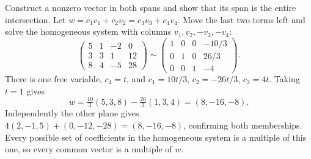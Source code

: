 \goal Construct a nonzero vector in both spans and show that its span is the entire intersection.
Let $w=c_1v_1+c_2v_2=c_3v_3+c_4v_4$. Move the last two terms left and
solve the homogeneous system with columns $v_1,v_2,-v_3,-v_4$:
\[
 \begin{pmatrix}5&1&-2&0\\3&3&1&12\\8&4&-5&28\end{pmatrix}
 \sim
 \begin{pmatrix}1&0&0&-10/3\\0&1&0&26/3\\0&0&1&-4\end{pmatrix}.
\]
There is one free variable, $c_4=t$, and
$c_1=10t/3$, $c_2=-26t/3$, $c_3=4t$. Taking $t=1$ gives
\[
 w=\tfrac{10}3(5,3,8)-\tfrac{26}3(1,3,4)=(8,-16,-8).
\]
Independently the other plane gives
$4(2,-1,5)+(0,-12,-28)=(8,-16,-8)$, confirming both memberships.
Every possible set of coefficients in the homogeneous system is a multiple
of this one, so every common vector is a multiple of $w$.
